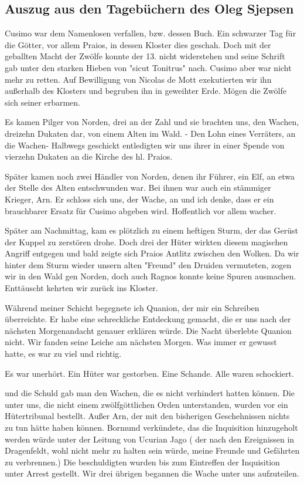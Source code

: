 \documentclass[11pt]{scrreprt}
\begin{document}
\subsection{Auszug aus den Tagebüchern des Oleg Sjepsen}

Cusimo war dem Namenlosen verfallen, bzw. dessen Buch. Ein schwarzer Tag für die Götter, vor allem Praios, in dessen Kloster dies geschah. Doch mit der geballten Macht der Zwölfe konnte der 13. nicht widerstehen und seine Schrift gab unter den starken Hieben von "sicut Tonitrus" nach. Cusimo aber war nicht mehr zu retten. Auf Bewilligung von Nicolas de Mott exekutierten wir ihn außerhalb des Klosters und begruben ihn in geweihter Erde. Mögen die Zwölfe sich seiner erbarmen.\par
Es kamen Pilger von Norden, drei an der Zahl und sie brachten uns, den Wachen, dreizehn Dukaten dar, von einem Alten im Wald. - Den Lohn eines Verräters, an die Wachen- Halbwegs geschickt entledigten wir uns ihrer in einer Spende von vierzehn Dukaten an die Kirche des hl. Praios.\par
Später kamen noch zwei Händler von Norden, denen ihr Führer, ein Elf, an etwa der Stelle des Alten entschwunden war. Bei ihnen war auch ein stämmiger Krieger, Arn. Er schloss sich uns, der Wache, an und ich denke, dass er ein brauchbarer Ersatz für Cusimo abgeben wird. Hoffentlich vor allem wacher.\par
Später am Nachmittag, kam es plötzlich zu einem heftigen Sturm, der das Gerüst der Kuppel zu zerstören drohe. Doch drei der Hüter wirkten diesem magischen Angriff entgegen und bald zeigte sich Praios Antlitz zwischen den Wolken. Da wir hinter dem Sturm wieder unsern alten "Freund" den Druiden vermuteten, zogen wir in den Wald gen Norden, doch auch Ragnos konnte keine Spuren ausmachen. Enttäuscht kehrten wir zurück ins Kloster.\par
Während meiner Schicht begegnete ich Quanion, der mir ein Schreiben überreichte. Er habe eine schreckliche Entdeckung gemacht, die er uns nach der nächsten Morgenandacht genauer erklären würde. Die Nacht überlebte Quanion nicht. Wir fanden seine Leiche am nächsten Morgen. Was immer er gewusst hatte, es war zu viel und richtig.\par
Es war unerhört. Ein Hüter war gestorben. Eine Schande. Alle waren schockiert.\par
und die Schuld gab man den Wachen, die es nicht verhindert hatten können. Die unter uns, die nicht einem zwölfgöttlichen Orden unterstanden, wurden vor ein Hütertribunal bestellt. Außer Arn, der mit den bisherigen Geschehnissen nichts zu tun hätte haben können. Bormund verkündete, das die Inquisition hinzugeholt werden würde unter der Leitung von Ucurian Jago ( der nach den Ereignissen in Dragenfeldt, wohl nicht mehr zu halten sein würde, meine Freunde und Gefährten zu verbrennen.) Die beschuldigten wurden bis zum Eintreffen der Inquisition unter Arrest gestellt. Wir drei übrigen begannen die Wache unter uns aufzuteilen.\par
\end{document}
